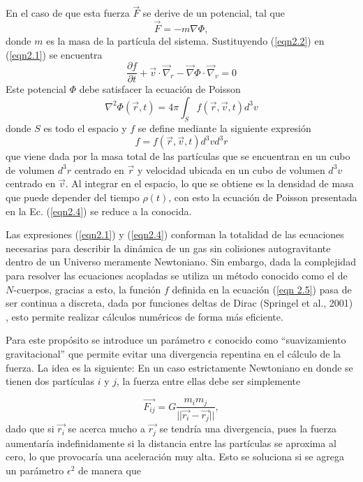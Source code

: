 \documentclass[a4paper,openright,12pt]{book}
\begin{document}
En el caso de que esta fuerza $\vec{F}$ se derive de un potencial, tal que 
\begin{equation}
\vec{F} = -m\nabla\Phi,\label{eqn2.2}
\end{equation}
donde $m$ es la masa de la partícula del sistema. Sustituyendo (\ref{eqn2.2}) en (\ref{eqn2.1}) se encuentra
\begin{equation}
\frac{\partial f}{\partial t} + \vec{v}\cdot\vec\nabla_{r} - \vec\nabla\Phi\cdot\vec\nabla_{v}=0\label{eqn2.3}
\end{equation} 
Este potencial $\Phi$ debe satisfacer la ecuación de Poisson
\begin{equation}
\nabla^{2} \Phi (\vec{r},t) = 4\pi \int_{S} f(\vec{r},\vec{v},t)d^{3}v\label{eqn2.4}
\end{equation}
donde $S$ es todo el espacio y $f$ se define mediante la siguiente expresión
\begin{equation}
f = f(\vec{r},\vec{v},t)d^{3}v d^{3}r\label{eqn 2.5}
\end{equation}
que viene dada por la masa total de las partículas que se encuentran en un cubo de volumen $d^{3}r$ centrado en $\vec{r}$ y velocidad ubicada en un cubo de volumen $d^{3}v$ centrado en $\vec{v}$. Al integrar en el espacio, lo que se obtiene es la densidad de masa que puede depender del tiempo $\rho(t)$, con esto la ecuación de Poisson presentada en la Ec. (\ref{eqn2.4}) se reduce a la conocida.

Las expresiones (\ref{eqn2.1}) y (\ref{eqn2.4}) conforman la totalidad de las ecuaciones necesarias para describir la dinámica de un gas sin colisiones autogravitante dentro de un Universo meramente Newtoniano. Sin embargo, dada la complejidad para resolver las ecuaciones acopladas se utiliza un método conocido como el de $N$-cuerpos, gracias a esto, la función $f$ definida en la ecuación (\ref{eqn 2.5}) pasa de ser continua a discreta, dada por funciones deltas de Dirac (Springel et al., 2001) \cite{b4}, esto permite realizar cálculos numéricos de forma más eficiente.

Para este propósito se introduce un parámetro $\epsilon$ conocido como “suavizamiento gravitacional” que permite evitar una divergencia repentina en el cálculo de la fuerza. La idea es la siguiente: En un caso estrictamente Newtoniano en donde se tienen dos partículas $i$ y $j$, la fuerza entre ellas debe ser simplemente

\begin{equation}
   \vec{F_{ij}}
  = G\frac{m_{i}m_{j}}{||\vec{r_{i}}-\vec{r_{j}}||},\label{eqn2.6}
\end{equation}
dado que si $\vec{r_{i}}$ se acerca mucho a $\vec{r_{j}}$ se tendría una divergencia, pues la fuerza aumentaría indefinidamente si la distancia entre las partículas se aproxima al cero, lo que provocaría una aceleración muy alta. Esto se soluciona si se agrega un parámetro $\epsilon^{2}$ de manera que 
\end{document}
